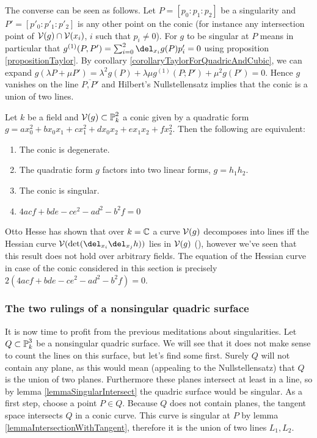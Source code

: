 The converse can be seen as follows. Let $P=[p_0:p_1:p_2]$ be a singularity and $P'=[p'_0:p'_1:p'_2]$ is any other point on the conic (for instance any intersection point of $\operatorname{\mathcal V}(g) \cap \operatorname{\mathcal V}(x_i)$, $i$ such that $p_i \neq 0$).
For $g$ to be singular at $P$ means in particular that $g^{(1)}(P,P') = \sum_{i=0}^2 \del_{x_i}g(P)p'_i = 0$ using proposition \ref{propositionTaylor}.
By corollary \ref{corollaryTaylorForQuadricAndCubic}, we can expand $g(\lambda P + \mu P') = \lambda^2 g(P) + \lambda\mu g^{(1)}(P;P') + \mu^2 g(P')= 0$.
Hence $g$ vanishes on the line $\overline{P,P'}$ and Hilbert's Nullstellensatz implies that the conic is a union of two lines.

\begin{theorem}
Let $k$ be a field and $\operatorname{\mathcal V}(g) \subset \operatorname{\mathbb P}^2_k$ a conic given by a quadratic form $g = ax_0^2 + bx_0x_1 + cx_1^2 + dx_0x_2 + ex_1x_2 + fx_2^2$.
Then the following are equivalent:
\begin{enumerate}
\item The conic is degenerate.
\item The quadratic form $g$ factors into two linear forms, $g=h_1h_2$.
\item The conic is singular.
\item $4acf + bde - ce^2 - ad^2 - b^2f = 0$
\end{enumerate}
\end{theorem}


\begin{remark}
Otto Hesse has shown that over $k=\operatorname{\mathbb C}$ a curve $\operatorname{\mathcal V}(g)$ decomposes into lines iff the Hessian curve $\V(\det(\del_{x_i}\del_{x_j}h))$ lies in $\operatorname{\mathcal V}(g)$ (\cite[p.289]{brieskorn2012plane}), however we've seen that this result does not hold over arbitrary fields.
The equation of the Hessian curve in case of the conic considered in this section is precisely $2(4acf + bde - ce^2 - ad^2 - b^2f) = 0$.
\end{remark}


\subsubsection{The two rulings of a nonsingular quadric surface}


It is now time to profit from the previous meditations about singularities.
Let $Q \subset \operatorname{\mathbb P}^3_k$ be a nonsingular quadric surface.
We will see that it does not make sense to count the lines on this surface, but let's find some first.
Surely $Q$ will not contain any plane, as this would mean (appealing to the Nullstellensatz) that $Q$ is the union of two planes.
Furthermore these planes intersect at least in a line, so by lemma \ref{lemmaSingularIntersect} the quadric surface would be singular.
As a first step, choose a point $P \in Q$.
Because $Q$ does not contain planes, the tangent space intersects $Q$ in a conic curve.
This curve is singular at $P$ by lemma \ref{lemmaIntersectionWithTangent}, therefore it is the union of two lines $L_1,L_2$.

